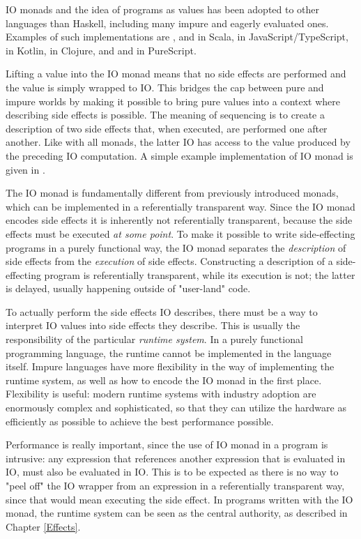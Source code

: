 IO monads and the idea of programs as values has been adopted to other languages than Haskell, including many impure and eagerly evaluated ones. Examples of such implementations are ,  and  in Scala,  in JavaScript/TypeScript,  in Kotlin,  in Clojure, and  and  in PureScript.

Lifting a value into the IO monad means that no side effects are performed and the value is simply wrapped to IO. This bridges the cap between pure and impure worlds by making it possible to bring pure values into a context where describing side effects is possible.
The meaning of sequencing is to create a description of two side effects that, when executed, are performed one after another. Like with all monads, the latter IO has access to the value produced by the preceding IO computation. A simple example implementation of IO monad is given in .



The IO monad is fundamentally different from previously introduced monads, which can be implemented in a referentially transparent way. Since the IO monad encodes side effects it is inherently not referentially transparent, because the side effects must be executed \emph{at some point}. To make it possible to write side-effecting programs in a purely functional way, the IO monad separates the \emph{description} of side effects from the \emph{execution} of side effects. Constructing a description of a side-effecting program is referentially transparent, while its execution is not; the latter is delayed, usually happening outside of "user-land" code.

To actually perform the side effects IO describes, there must be a way to interpret IO values into side effects they describe. This is usually the responsibility of the particular \emph{runtime system}. In a purely functional programming language, the runtime cannot be implemented in the language itself. Impure languages have more flexibility in the way of implementing the runtime system, as well as how to encode the IO monad in the first place. Flexibility is useful: modern runtime systems with industry adoption are enormously complex and sophisticated, so that they can utilize the hardware as efficiently as possible to achieve the best performance possible.

Performance is really important, since the use of IO monad in a program is intrusive: any expression that references another expression that is evaluated in IO, must also be evaluated in IO. This is to be expected as there is no way to "peel off" the IO wrapper from an expression in a referentially transparent way, since that would mean executing the side effect. In programs written with the IO monad, the runtime system can be seen as the central authority, as described in Chapter \ref{Effects}.


